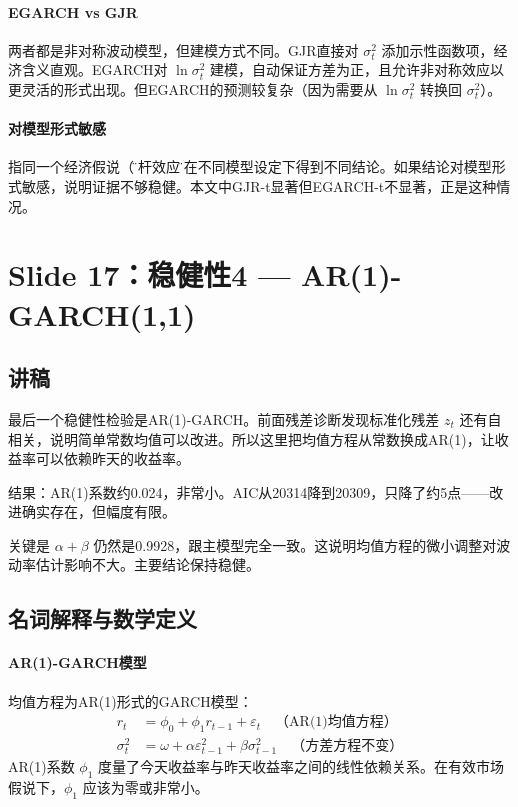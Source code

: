 \documentclass[11pt,a4paper]{article}
\begin{document}
\paragraph{EGARCH vs GJR} 两者都是非对称波动模型，但建模方式不同。GJR直接对 \(\sigma_t^2\) 添加示性函数项，经济含义直观。EGARCH对 \(\ln\sigma_t^2\) 建模，自动保证方差为正，且允许非对称效应以更灵活的形式出现。但EGARCH的预测较复杂（因为需要从 \(\ln\sigma_t^2\) 转换回 \(\sigma_t^2\)）。

\paragraph{对模型形式敏感} 指同一个经济假说（\"杠杆效应\"）在不同模型设定下得到不同结论。如果结论对模型形式敏感，说明证据不够稳健。本文中GJR-t显著但EGARCH-t不显著，正是这种情况。

\newpage
\section*{Slide 17：稳健性4 — AR(1)-GARCH(1,1)}

\subsection*{讲稿}
最后一个稳健性检验是AR(1)-GARCH。前面残差诊断发现标准化残差 \(z_t\) 还有自相关，说明简单常数均值可以改进。所以这里把均值方程从常数换成AR(1)，让收益率可以依赖昨天的收益率。

结果：AR(1)系数约0.024，非常小。AIC从20314降到20309，只降了约5点——改进确实存在，但幅度有限。

关键是 \(\alpha + \beta\) 仍然是0.9928，跟主模型完全一致。这说明均值方程的微小调整对波动率估计影响不大。主要结论保持稳健。

\subsection*{名词解释与数学定义}

\paragraph{AR(1)-GARCH模型} 均值方程为AR(1)形式的GARCH模型：
\begin{align*}
r_t &= \phi_0 + \phi_1 r_{t-1} + \varepsilon_t \quad \text{（AR(1)均值方程）}\\
\sigma_t^2 &= \omega + \alpha \varepsilon_{t-1}^2 + \beta \sigma_{t-1}^2 \quad \text{（方差方程不变）}
\end{align*}
AR(1)系数 \(\phi_1\) 度量了今天收益率与昨天收益率之间的线性依赖关系。在有效市场假说下，\(\phi_1\) 应该为零或非常小。
\end{document}
